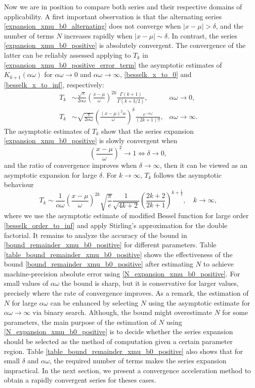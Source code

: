 \documentclass[10pt,a4paper,oneside]{article}
\numberwithin{equation}{section}
\begin{document}
Now we are in position to compare both series and their respective domains of applicability. A first important observation is that the alternating series \eqref{expansion_xmu_b0_alternating} does not converge when $|x - \mu| > \delta$, and the number of terms $N$ increases rapidly when $|x - \mu| \sim \delta$. In contrast, the series \eqref{expansion_xmu_b0_positive} is absolutely convergent. The convergence of the latter can be reliably assessed applying to $T_k$ in \eqref{expansion_xmu_b0_positive_error_term} the asymptotic estimates of $K_{k+1}(\alpha\omega)$ for $\alpha \omega \to 0$ and $\alpha \omega \to \infty$, \eqref{besselk_x_to_0} and \eqref{besselk_x_to_inf}, respectively:
\begin{align*}
T_k &\sim \frac{\sqrt{\pi}}{2\alpha\omega} \left(\frac{x-\mu}{\omega}\right)^{2k}\frac{\Gamma(k + 1)}{\Gamma(k + 3/2)}, & \alpha\omega \to 0,\\
T_k &\sim \sqrt{\frac{\pi}{2\alpha \omega}} \left(\frac{(x-\mu)^2\alpha}{\omega}\right)^k \frac{e^{-\alpha \omega}}{(2k + 1)!!}, &\alpha\omega \to \infty.
\end{align*}
The asymptotic estimates of $T_k$ show that the series expansion \eqref{expansion_xmu_b0_positive} is slowly convergent when
\begin{equation*}
\left(\frac{x-\mu}{\omega}\right)^2 \to 1 \Longleftrightarrow \delta \to 0,
\end{equation*}
and the ratio of convergence improves when $\delta \to \infty$, then it can be viewed as an asymptotic expansion for large $\delta$. For $k \to \infty$, $T_k$ follows the asymptotic behaviour
\begin{equation*}
T_k \sim \frac{1}{\alpha\omega}\left(\frac{x-\mu}{\omega}\right)^{2k}\sqrt{\frac{\pi}{e}}\frac{1}{\sqrt{4k + 2}}\left(\frac{2k + 2}{2k + 1}\right)^{k + \frac{1}{2}}, \quad k \to \infty,
\end{equation*}
where we use the asymptotic estimate of modified Bessel function for large order \eqref{besselk_order_to_inf} and apply Stirling's approximation for the double factorial. It remains to analyze the accuracy of the bound in \eqref{bound_remainder_xmu_b0_positive} for different parameters. Table \ref{table_bound_remainder_xmu_b0_positive} shows the effectiveness of the bound \eqref{bound_remainder_xmu_b0_positive} after estimating $N$ to achieve machine-precision absolute error using \eqref{N_expansion_xmu_b0_positive}. For small values of $\alpha\omega$ the bound is sharp, but it is conservative for larger values, precisely where the rate of convergence improves. As a remark, the estimation of $N$ for large $\alpha\omega$ can be enhanced by selecting $N$ using the asymptotic estimate for $\alpha\omega \to \infty$ via binary search. Although, the bound might overestimate $N$ for some parameters, the main purpose of the estimation of $N$ using \eqref{N_expansion_xmu_b0_positive} is to decide whether the series expansion should be selected as the method of computation given a certain parameter region. Table \ref{table_bound_remainder_xmu_b0_positive} also shows that for small $\delta$ and $\alpha\omega$, the required number of terms makes the series expansion impractical. In the next section, we present a convergence acceleration method to obtain a rapidly convergent series for theses cases.
\end{document}
